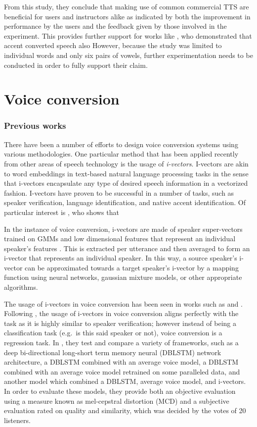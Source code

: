 \documentclass
[
    a4paper,
    twoside,
    12pt
]
{report}
\begin{document}
From this study, they conclude that making use of common commercial TTS
are beneficial for users and instructors alike as indicated by both the
improvement in performance by the users and the feedback given by those
involved in the experiment. This provides further support for works like
\parencite{felps2009}, who demonstrated that accent converted speech
also However, because the study was limited to individual words and only
six pairs of vowels, further experimentation needs to be conducted in
order to fully support their claim.

\hypertarget{voice-conversion}{%
\section{Voice conversion}\label{voice-conversion}}

\subsubsection*{Previous works}

There have been a number of efforts to design voice conversion systems
using various methodologies. One particular method that has been applied
recently from other areas of speech technology is the usage of
\emph{i-vectors}. I-vectors are akin to word embeddings in text-based
natural language processing tasks in the sense that i-vectors
encapsulate any type of desired speech information in a vectorized
fashion. I-vectors have proven to be successful in a number of tasks,
such as speaker verification, language identification, and native accent
identification. Of particular interest is \textcite{demarco2013}, who
shows that

In the instance of voice conversion, i-vectors are made of speaker
super-vectors trained on GMMs and low dimensional features that
represent an individual speaker's features \parencite{wu2016}. This is
extracted per utterance and then averaged to form an i-vector that
represents an individual speaker. In this way, a source speaker's
i-vector can be approximated towards a target speaker's i-vector by a
mapping function using neural networks, gaussian mixture models, or
other appropriate algorithms.

The usage of i-vectors in voice conversion has been seen in works such
as \textcite{wu2016} and \textcite{kinnunen2017}. Following
\textcite{kinnunen2017}, the usage of i-vectors in voice conversion
aligns perfectly with the task as it is highly similar to speaker
verification; however instead of being a classification task (e.g.~is
this said speaker or not), voice conversion is a regression task. In
\textcite{wu2016}, they test and compare a variety of frameworks, such
as a deep bi-directional long-short term memory neural (DBLSTM) network
architecture, a DBLSTM combined with an average voice model, a DBLSTM
combined with an average voice model retrained on some paralleled data,
and another model which combined a DBLSTM, average voice model, and
i-vectors. In order to evaluate these models, they provide both an
objective evaluation using a measure known as mel-cepstral distortion
(MCD) and a subjective evaluation rated on quality and similarity, which
was decided by the votes of 20 listeners.
\end{document}
